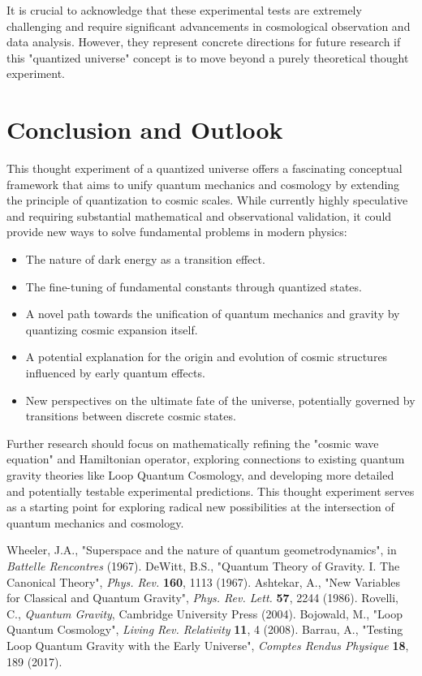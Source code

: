 \documentclass[12pt,a4paper]{article}
\begin{document}
	It is crucial to acknowledge that these experimental tests are extremely challenging and require significant advancements in cosmological observation and data analysis.  However, they represent concrete directions for future research if this "quantized universe" concept is to move beyond a purely theoretical thought experiment.
	
	\section{Conclusion and Outlook}
	
	This thought experiment of a quantized universe offers a fascinating conceptual framework that aims to unify quantum mechanics and cosmology by extending the principle of quantization to cosmic scales.  While currently highly speculative and requiring substantial mathematical and observational validation, it could provide new ways to solve fundamental problems in modern physics:
	
	\begin{itemize}
		\item The nature of dark energy as a transition effect.
		\item The fine-tuning of fundamental constants through quantized states.
		\item A novel path towards the unification of quantum mechanics and gravity by quantizing cosmic expansion itself.
		\item A potential explanation for the origin and evolution of cosmic structures influenced by early quantum effects.
		\item New perspectives on the ultimate fate of the universe, potentially governed by transitions between discrete cosmic states.
	\end{itemize}
	
	Further research should focus on mathematically refining the "cosmic wave equation" and Hamiltonian operator, exploring connections to existing quantum gravity theories like Loop Quantum Cosmology, and developing more detailed and potentially testable experimental predictions. This thought experiment serves as a starting point for exploring radical new possibilities at the intersection of quantum mechanics and cosmology.
	
	\begin{thebibliography}{99}
		
		 Wheeler, J.A., "Superspace and the nature of quantum geometrodynamics", in \textit{Battelle Rencontres} (1967).
		 DeWitt, B.S., "Quantum Theory of Gravity. I. The Canonical Theory", \textit{Phys. Rev.} \textbf{160}, 1113 (1967).
		 Ashtekar, A., "New Variables for Classical and Quantum Gravity", \textit{Phys. Rev. Lett.} \textbf{57}, 2244 (1986).
		 Rovelli, C., \textit{Quantum Gravity}, Cambridge University Press (2004).
		 Bojowald, M., "Loop Quantum Cosmology", \textit{Living Rev. Relativity} \textbf{11}, 4 (2008).
		 Barrau, A., "Testing Loop Quantum Gravity with the Early Universe", \textit{Comptes Rendus Physique} \textbf{18}, 189 (2017).
		
	\end{thebibliography}
	
\end{document}
